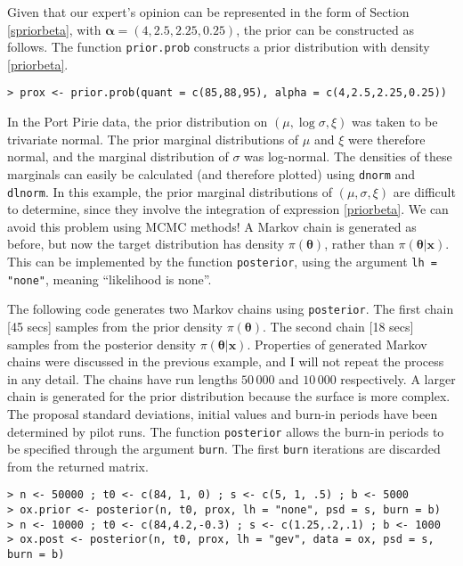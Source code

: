 \documentclass[11pt,a4paper]{article}
\newcommand{\bs}{\boldsymbol}
\begin{document}
Given that our expert's opinion can be represented in the form of
Section \ref{spriorbeta}, with $\bs{\alpha} = (4,2.5,2.25,0.25)$, the
prior can be constructed as follows.  The function \verb+prior.prob+
constructs a prior distribution with density \eqref{priorbeta}.

\begin{verbatim}
> prox <- prior.prob(quant = c(85,88,95), alpha = c(4,2.5,2.25,0.25))
\end{verbatim}

In the Port Pirie data, the prior distribution on $(\mu,\log
\sigma,\xi)$ was taken to be trivariate normal.  The prior marginal
distributions of $\mu$ and $\xi$ were therefore normal, and the
marginal distribution of $\sigma$ was log-normal.  The densities of
these marginals can easily be calculated (and therefore plotted) using
\verb+dnorm+ and \verb+dlnorm+.  In this example, the prior marginal
distributions of $(\mu,\sigma,\xi)$ are difficult to determine, since
they involve the integration of expression \eqref{priorbeta}.  We can
avoid this problem using MCMC methods!  A Markov chain is generated as
before, but now the target distribution has density
$\pi(\bs{\theta})$, rather than $\pi(\bs{\theta}|\bs{x})$.  This can
be implemented by the function \verb+posterior+, using the argument
\verb+lh = "none"+, meaning ``likelihood is none''.

The following code generates two Markov chains using \verb+posterior+.
The first chain [45 secs] samples from the prior density
$\pi(\bs{\theta})$.  The second chain [18 secs] samples from the
posterior density $\pi(\bs{\theta}|\bs{x})$.  Properties of generated
Markov chains were discussed in the previous example, and I will not
repeat the process in any detail.  The chains have run lengths
$50\,000$ and $10\,000$ respectively.  A larger chain is generated for
the prior distribution because the surface is more complex.  The
proposal standard deviations, initial values and burn-in periods have
been determined by pilot runs.  The function \verb+posterior+ allows
the burn-in periods to be specified through the argument \verb+burn+.
The first \verb+burn+ iterations are discarded from the returned
matrix.

\begin{verbatim}
> n <- 50000 ; t0 <- c(84, 1, 0) ; s <- c(5, 1, .5) ; b <- 5000
> ox.prior <- posterior(n, t0, prox, lh = "none", psd = s, burn = b)
> n <- 10000 ; t0 <- c(84,4.2,-0.3) ; s <- c(1.25,.2,.1) ; b <- 1000
> ox.post <- posterior(n, t0, prox, lh = "gev", data = ox, psd = s, burn = b)
\end{verbatim}
\end{document}
